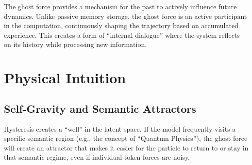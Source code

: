 \documentclass[12pt,a4paper]{article}
\begin{document}
The ghost force provides a mechanism for the past to actively influence future dynamics. Unlike passive memory storage, the ghost force is an active participant in the computation, continuously shaping the trajectory based on accumulated experience. This creates a form of ``internal dialogue'' where the system reflects on its history while processing new information.

\section{Physical Intuition}

\subsection{Self-Gravity and Semantic Attractors}

Hysteresis creates a ``well'' in the latent space. If the model frequently visits a specific semantic region (e.g., the concept of ``Quantum Physics''), the ghost force will create an attractor that makes it easier for the particle to return to or stay in that semantic regime, even if individual token forces are noisy.
\end{document}
